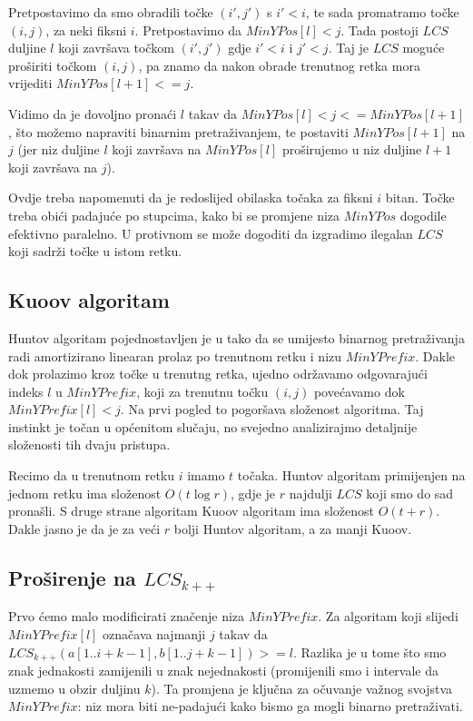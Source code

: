 \documentclass[times, utf8, seminar, numeric]{fer}
\begin{document}
Pretpostavimo da smo obradili točke $(i', j')$ s $i' < i$, te sada
promatramo točke $(i, j)$, za neki fiksni $i$. Pretpostavimo da
$MinYPos[l] < j$.  Tada postoji $LCS$ duljine $l$ koji završava točkom
$(i', j')$ gdje $i' < i$ i $j' < j$. Taj je $LCS$ moguće proširiti točkom
$(i, j)$, pa znamo da nakon obrade trenutnog retka mora vrijediti
$MinYPos[l+1] <= j$.  

Vidimo da je dovoljno pronaći $l$ takav da $MinYPos[l] < j <=
MinYPos[l+1]$, što možemo napraviti binarnim pretraživanjem, te
postaviti $MinYPos[l+1]$ na $j$ (jer niz duljine $l$ koji završava
na $MinYPos[l]$ proširujemo u niz duljine $l+1$ koji završava na
$j$).

Ovdje treba napomenuti da je redoslijed obilaska točaka za fiksni $i$
bitan. Točke treba obići padajuće po stupcima, kako bi se promjene
niza $MinYPos$ dogodile efektivno paralelno. U protivnom se može
dogoditi da izgradimo ilegalan $LCS$ koji sadrži točke u istom
retku.

\subsection{Kuoov algoritam}
Huntov algoritam pojednostavljen je u \cite{Kuo} tako da se umijesto
binarnog pretraživanja radi amortizirano linearan prolaz po trenutnom
retku i nizu $MinYPrefix$. Dakle dok prolazimo kroz točke u trenutng 
retka, ujedno održavamo odgovarajući indeks $l$ u $MinYPrefix$, koji
za trenutnu točku $(i, j)$ povećavamo dok $MinYPrefix[l] < j$. 
Na prvi pogled to pogoršava složenost algoritma. Taj instinkt je
točan u općenitom slučaju, no svejedno analizirajmo detaljnije
složenosti tih dvaju pristupa.

Recimo da u trenutnom retku $i$ imamo $t$ točaka. Huntov algoritam
primijenjen na jednom retku ima složenost $O(t \log r)$, gdje je
$r$ najdulji $LCS$ koji smo do sad pronašli. S druge strane algoritam
Kuoov algoritam ima složenost $O(t + r)$. Dakle jasno je da je za
veći $r$ bolji Huntov algoritam, a za manji Kuoov.

\subsection{Proširenje na $LCS_{k++}$}
Prvo ćemo malo modificirati značenje niza $MinYPrefix$.
Za algoritam koji slijedi $MinYPrefix[l]$ označava najmanji $j$
takav da $LCS_{k++}(a[1..i+k-1], b[1..j+k-1]) >= l$. Razlika je
u tome što smo znak jednakosti zamijenili u znak nejednakosti
(promijenili smo i intervale da uzmemo u obzir duljinu $k$). 
Ta promjena je ključna za očuvanje važnog svojstva $MinYPrefix$:
niz mora biti ne-padajući kako bismo ga mogli binarno pretraživati.
\end{document}
